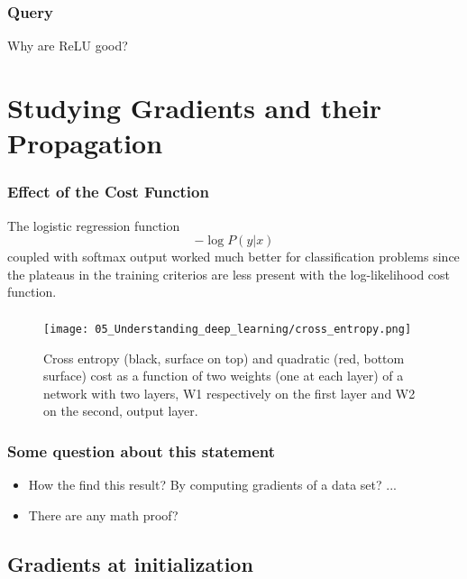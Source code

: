 \begin{frame}
  \frametitle{Query}

  \begin{center}
  \Huge
  Why are ReLU good?
\end{center}

\end{frame}

\section{Studying Gradients and their Propagation}

\begin{frame}
  \frametitle{Effect of the Cost Function}

  The logistic regression function 
  \begin{equation}
    - \log P(y | x)
  \end{equation}
  coupled with softmax output worked much better for classification problems since the 
  plateaus in the training criterios are less present with the log-likelihood cost function. 


\end{frame}

\begin{frame}
  \frametitle{}
  \begin{figure}[t]
    \centering
    \texttt{[image: 05\_Understanding\_deep\_learning/cross\_entropy.png]}
    \caption{
      Cross entropy (black, surface on top) and quadratic (red, bottom surface) cost as a function of two weights (one at each layer) of a network with two layers, W1 respectively on the first layer and W2 on the second, output layer.
    }
  \end{figure}
\end{frame}

\begin{frame}
  \frametitle{Some question about this statement}

  \begin{itemize}
    \item How the find this result? By computing gradients of a data set? ...
    
    \item There are any math proof? 
  \end{itemize}

\end{frame}

\subsection{Gradients at initialization}

